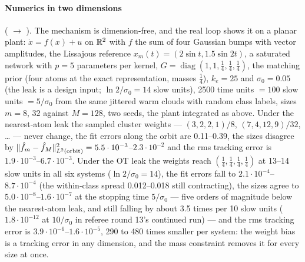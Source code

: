 \paragraph{Numerics in two dimensions} ( $\to$ ). The mechanism is
dimension-free, and the real loop shows it on a planar plant: $\dot x = f(x) + u$ on $\mathbb{R}^2$ with $f$ the sum of four
Gaussian bumps with vector amplitudes, the Lissajous reference $x_m(t) = (2\sin t,1.5\sin2t)$, a saturated network
with $p = 5$ parameters per kernel, $G = \operatorname{diag}(1,1,\frac14,\frac14,\frac14)$, the matching prior (four
atoms at the exact representation, masses $\frac14$), $k_e = 25$ and $\sigma_0 = 0.05$ (the leak is a design input;
$\ln2/\sigma_0 = 14$ slow units), 2500 time units ${}= 100$ slow units ${}= 5/\sigma_0$ from the same jittered warm
clouds with random class labels, sizes $m = 8$, $32$ against $M = 128$, two seeds, the plant integrated as above.
Under the nearest-atom leak the sampled cluster weights --- $(3,2,2,1)/8$, $(7,4,12,9)/32$, \dots{} --- never
change, the fit errors along the orbit are 0.11--0.39, the sizes disagree by
$\lVert \hat f_m - \hat f_M\rVert^2_{L^2(\mathrm{orbit})} = 5.5\cdot10^{-3}$--$2.3\cdot10^{-2}$ and the rms tracking error
is $1.9\cdot10^{-3}$--$6.7\cdot10^{-3}$. Under the OT leak the weights reach $(\frac14,\frac14,\frac14,\frac14)$ at
13--14 slow units in all six systems ($\ln2/\sigma_0 = 14$), the fit errors fall to
$2.1\cdot10^{-4}$--$8.7\cdot10^{-4}$ (the within-class spread 0.012--0.018 still contracting), the sizes agree to
$5.0\cdot10^{-8}$--$1.6\cdot10^{-7}$ at the stopping time $5/\sigma_0$ --- five orders of magnitude below the
nearest-atom leak, and still falling by about 3.5 times per 10 slow units ($1.8\cdot10^{-12}$ at $10/\sigma_0$ in
referee round 13's continued run) --- and the rms tracking error is $3.9\cdot10^{-6}$--$1.6\cdot10^{-5}$, 290 to 480
times smaller per system: the weight bias is a tracking error in any dimension, and the mass constraint removes it
for every size at once.

